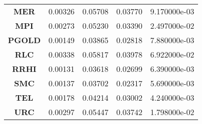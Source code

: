 \begin{longtable}[c]{ccccc}
    \textbf{MER}    & 0.00326                        & 0.05708       & 0.03770      & 9.170000e-03                        \\
    \textbf{MPI}    & 0.00273                        & 0.05230       & 0.03390      & 2.497000e-02                        \\
    \textbf{PGOLD}  & 0.00149                        & 0.03865       & 0.02818      & 7.880000e-03                        \\
    \textbf{RLC}    & 0.00338                        & 0.05817       & 0.03978      & 6.922000e-02                        \\
    \textbf{RRHI}   & 0.00131                        & 0.03618       & 0.02699      & 6.390000e-03                        \\
    \textbf{SMC}    & 0.00137                        & 0.03702       & 0.02317      & 5.690000e-03                        \\
    \textbf{TEL}    & 0.00178                        & 0.04214       & 0.03002      & 4.240000e-03                        \\
    \textbf{URC}    & 0.00297                        & 0.05447       & 0.03742      & 1.798000e-02                        \\ \hline
\end{longtable}